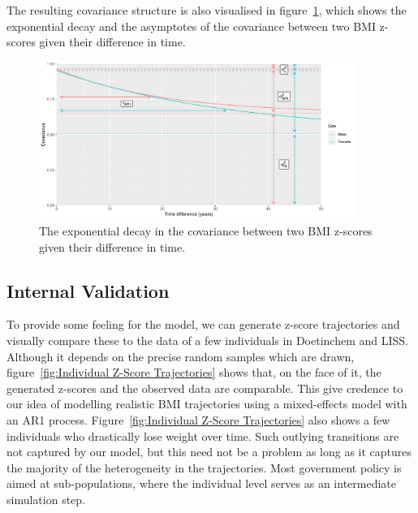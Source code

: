 \documentclass{imammb}
\numberwithin{equation}{section}
\begin{document}
The resulting covariance structure is also visualised in figure~\ref{fig:Covariance By Time Difference}, which shows the exponential decay and the asymptotes of the covariance between two BMI z-scores given their difference in time.

\vspace{-4mm}

\begin{figure}[h]
\centering
\includegraphics[width=0.92\textwidth] {"Figures/Covariance By Time Difference.pdf"}
\caption{The exponential decay in the covariance between two BMI z-scores given their difference in time.}
\label{fig:Covariance By Time Difference}
\vspace*{-9pt}
\end{figure}

\subsection{Internal Validation}
\label{sec:Individual Trajectories/Internal Validation}

To provide some feeling for the model, we can generate z-score trajectories and visually compare these to the data of a few individuals in Doetinchem and LISS. Although it depends on the precise random samples which are drawn, figure~\ref{fig:Individual Z-Score Trajectories} shows that, on the face of it, the generated z-scores and the observed data are comparable. This give credence to our idea of modelling realistic BMI trajectories using a mixed-effects model with an AR1 process. Figure~\ref{fig:Individual Z-Score Trajectories} also shows a few individuals who drastically lose weight over time. Such outlying transitions are not captured by our model, but this need not be a problem as long as it captures the majority of the heterogeneity in the trajectories. Most government policy is aimed at sub-populations, where the individual level serves as an intermediate simulation step.
\end{document}
